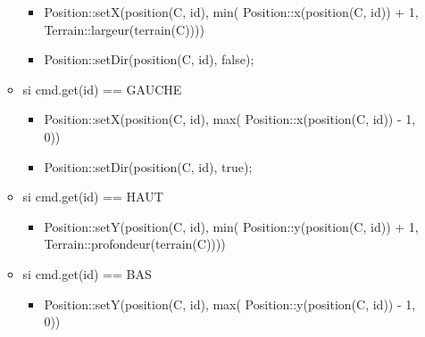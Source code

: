 \documentclass[11pt]{article}
\begin{document}
\begin{itemize}
\begin{itemize}
\begin{itemize}

\item Position::setX(position(C, id), min( Position::x(position(C, id)) + 1, Terrain::largeur(terrain(C))))\\
\label{sec-1.7.3.6.3.1}


\item Position::setDir(position(C, id), false);\\
\label{sec-1.7.3.6.3.2}


\end{itemize} %

\item si cmd.get(id) == GAUCHE\\
\label{sec-1.7.3.6.4}

\begin{itemize}

\item Position::setX(position(C, id), max( Position::x(position(C, id)) - 1, 0))\\
\label{sec-1.7.3.6.4.1}


\item Position::setDir(position(C, id), true);\\
\label{sec-1.7.3.6.4.2}


\end{itemize} %

\item si cmd.get(id) == HAUT\\
\label{sec-1.7.3.6.5}

\begin{itemize}

\item Position::setY(position(C, id), min( Position::y(position(C, id)) + 1, Terrain::profondeur(terrain(C))))\\
\label{sec-1.7.3.6.5.1}


\end{itemize} %

\item si cmd.get(id) == BAS\\
\label{sec-1.7.3.6.6}

\begin{itemize}

\item Position::setY(position(C, id), max( Position::y(position(C, id)) - 1, 0))\\
\label{sec-1.7.3.6.6.1}



\end{itemize}
\end{itemize}
\end{itemize}
\end{document}
